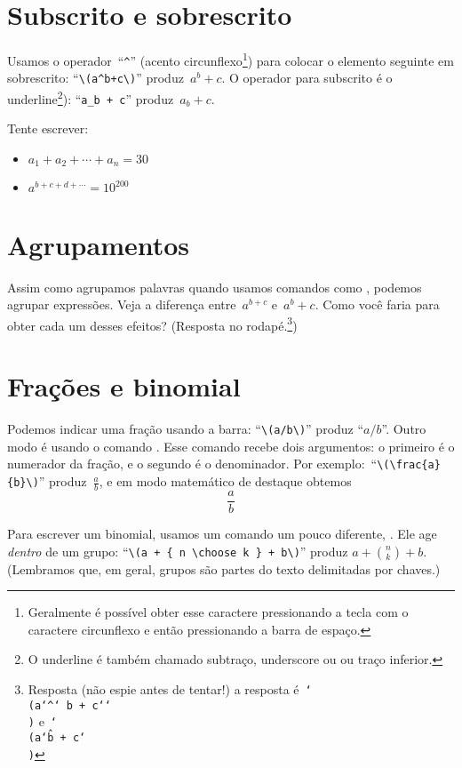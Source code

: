 \documentclass[article,openany]{memoir}
\begin{document}
\chapter{Subscrito e sobrescrito}

Usamos o operador~``\verb/^/'' (acento circunflexo\footnote{Geralmente
  é possível obter esse caractere pressionando a tecla com o caractere
  circunflexo e então pressionando a barra de espaço.}) para colocar o
elemento seguinte em sobrescrito: ``\verb/\(a^b+c\)/'' produz~\(a^b +
c\). O operador para subscrito é o underline\footnote{O underline é
  também chamado subtraço, underscore ou ou traço inferior.}):
``\verb/a_b + c/'' produz~\(a_b + c\).

Tente escrever:
\begin{itemize}
\item \(a_1 + a_2 + \cdots + a_n = 30\)
\item \(a^{b + c + d + \cdots} = 10^{200}\)
\end{itemize}

\chapter{Agrupamentos}

Assim como agrupamos palavras quando usamos comandos como ,
podemos agrupar expressões. Veja a diferença entre~\(a^{b + c}\)
e~\(a^b + c\). Como você faria para obter cada um desses
efeitos? (Resposta no rodapé.\footnote{Resposta (não espie antes de tentar!) a resposta
  é~\texttt{\char`\\(a\char`\^\char`{ b + c\char`}\char`\\)}
e~\texttt{\char`\\(a\char`\^b + c\char`\\)}})

\chapter{Frações e binomial}

Podemos indicar uma fração usando a barra: ``\verb-\(a/b\)-'' produz
``\(a/b\)''. Outro modo é usando o comando . Esse comando
recebe dois argumentos: o primeiro é o numerador da fração, e o
segundo é o denominador. Por exemplo:~``\verb/\(\frac{a}{b}\)/''
produz~\(\frac{a}{b}\), e em modo matemático de destaque obtemos
\[
\frac{a}{b}
\]

Para escrever um binomial, usamos um comando um pouco diferente,
. Ele age \emph{dentro} de um grupo:
``\verb/\(a + { n \choose k } + b\)/'' produz \(a + { n \choose k } +
b\). (Lembramos que, em geral, grupos são partes do texto delimitadas
por chaves.)
\end{document}
